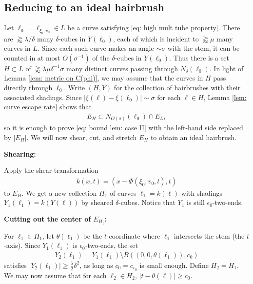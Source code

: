 \documentclass[12pt]{amsart}
\numberwithin{equation}{section}
\newcommand{\1}{\mathbbm{1}}
\begin{document}
\subsection{Reducing to an ideal hairbrush}

Let $\ell_0 = \ell_{\xi_0, v_0} \in L$ be a curve satisfying \eqref{eq: high mult tube property}. There are $\gtrapprox \lambda / \delta$ many $\delta$-cubes in $Y(\ell_0)$, each of which is incident to $\gtrapprox \mu$ many curves in $L$. Since each such curve makes an angle $\sim \sigma$ with the stem, it can be counted in at most $O(\sigma^{-1})$ of the $\delta$-cubes in $Y(\ell_0)$. Thus there is a set $H \subset L$ of $\gtrapprox \lambda \mu \delta^{-1} \sigma$ many distinct curves passing through $N_\delta(\ell_0)$. In light of Lemma \ref{lem: metric on C(phi)}, we may assume that the curves in $H$ pass directly through $\ell_0$. Write $(H,Y)$ for the collection of hairbrushes with their associated shadings. Since $|\xi(\ell) - \xi(\ell_0)| \sim \sigma$ for each $\ell \in H$, Lemma \ref{lem: curve escape rate} shows that 
\begin{align}
    E_H \subset N_{O(\sigma)}(\ell_0) \cap E_L,
\end{align}
so it is enough to prove \eqref{eq: bound lem: case II} with the left-hand side replaced by $|E_H|$.
We will now shear, cut, and stretch $E_H$ to obtain an ideal hairbrush.

\medskip

\noindent \textbf{Shearing:}

Apply the shear transformation 
\begin{align}
    k(x,t) = (x - \Phi(\xi_0, v_0, t), t)
\end{align}
to $E_H$. We get a new collection $H_1$ of curves $\ell_1 = k(\ell)$ with shadings $Y_1(\ell_1) = k(Y(\ell))$ by sheared $\delta$-cubes. Notice that $Y_1$ is still $\epsilon_0$-two-ends. 

\medskip

\noindent \textbf{Cutting out the center of $E_{H_1}$:}

For $\ell_1 \in H_1$, let $\theta(\ell_1)$ be the $t$-coordinate where $\ell_1$ intersects the stem (the $t$-axis). Since $Y_1(\ell_1)$ is $\epsilon_0$-two-ends, the set 
\begin{align}
    Y_2(\ell_1) = Y_1(\ell_1) \setminus B((0,0,\theta(\ell_1)), c_0)
\end{align}
satisfies $|Y_2(\ell_1)| \geq \frac{\lambda}{2} \delta^2$, as long as $c_0 = c_{\epsilon_0}$ is small enough. Define $H_2 = H_1$. We may now assume that for each $\ell_2 \in H_2$, $|t - \theta(\ell)| \geq c_0$. 
\end{document}
